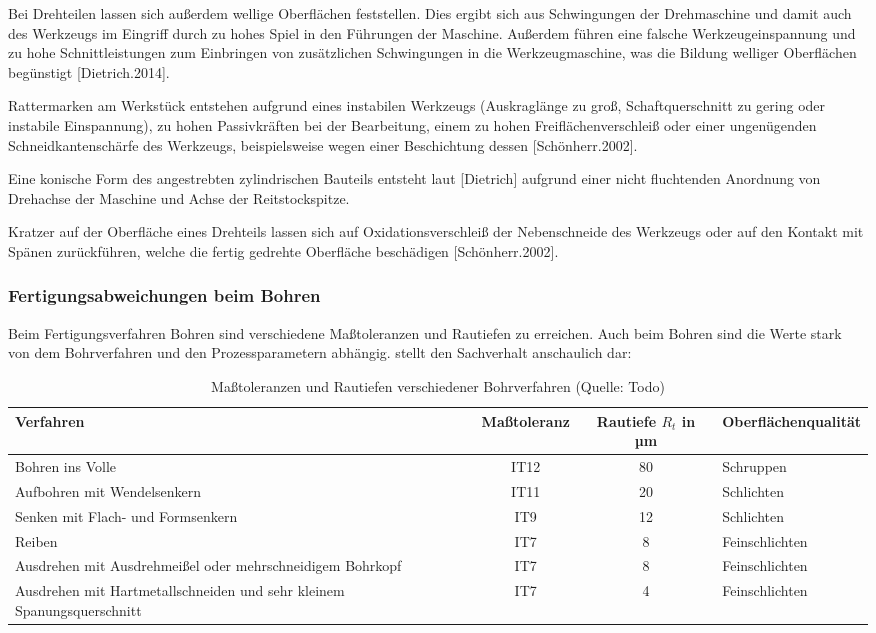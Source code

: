 Bei Drehteilen lassen sich außerdem wellige Oberflächen feststellen. Dies ergibt sich aus Schwingungen der Drehmaschine und damit auch des Werkzeugs im Eingriff durch zu hohes Spiel in den Führungen der Maschine. Außerdem führen eine falsche Werkzeugeinspannung und zu hohe Schnittleistungen zum Einbringen von zusätzlichen Schwingungen in die Werkzeugmaschine, was die Bildung welliger Oberflächen begünstigt [Dietrich.2014]. 

Rattermarken am Werkstück entstehen aufgrund eines instabilen Werkzeugs (Auskraglänge zu groß, Schaftquerschnitt zu gering oder instabile Einspannung), zu hohen Passivkräften bei der Bearbeitung, einem zu hohen Freiflächenverschleiß oder einer ungenügenden Schneidkantenschärfe des Werkzeugs, beispielsweise wegen einer Beschichtung dessen [Schönherr.2002].

Eine konische Form des angestrebten zylindrischen Bauteils entsteht laut [Dietrich] aufgrund einer nicht fluchtenden Anordnung von Drehachse der Maschine und Achse der Reitstockspitze. 

Kratzer auf der Oberfläche eines Drehteils lassen sich auf Oxidationsverschleiß der Nebenschneide des Werkzeugs oder auf den Kontakt mit Spänen zurückführen, welche die fertig gedrehte Oberfläche beschädigen [Schönherr.2002]. 

\subsubsection {Fertigungsabweichungen beim Bohren}

Beim Fertigungsverfahren Bohren sind verschiedene Maßtoleranzen und Rautiefen zu erreichen. Auch beim Bohren sind die Werte stark von dem Bohrverfahren und den Prozessparametern abhängig.
 stellt den Sachverhalt anschaulich dar:

\begin{table}[h]	
	
	\begin{tabularx}{\columnwidth}{|X|c|c|l|}	
		
		
		\hline
		\textbf{Verfahren}&\textbf{Maßtoleranz}&\textbf{Rautiefe $R_{t}$ in µm}&\textbf{Oberflächenqualität}\\
		\hline
		Bohren ins Volle&IT12&80&Schruppen\\
		\hline
		Aufbohren mit Wendelsenkern&IT11&20&Schlichten\\
		\hline
		Senken mit Flach- und Form\-senkern&IT9&12&Schlichten\\
		\hline
		Reiben&IT7&8&Feinschlichten\\
		\hline
		Ausdrehen mit Ausdrehmeißel oder mehrschneidigem Bohrkopf&IT7&8&Feinschlichten\\
		\hline
		Ausdrehen mit Hartmetallschneiden und sehr kleinem Spanungsquerschnitt&IT7&4&Feinschlichten\\
		\hline	
		
	\end{tabularx}
	
	\caption{Maßtoleranzen und Rautiefen verschiedener Bohrverfahren (Quelle: Todo)}
	\label{tab:bohrungsqualitaet}

\end{table}

